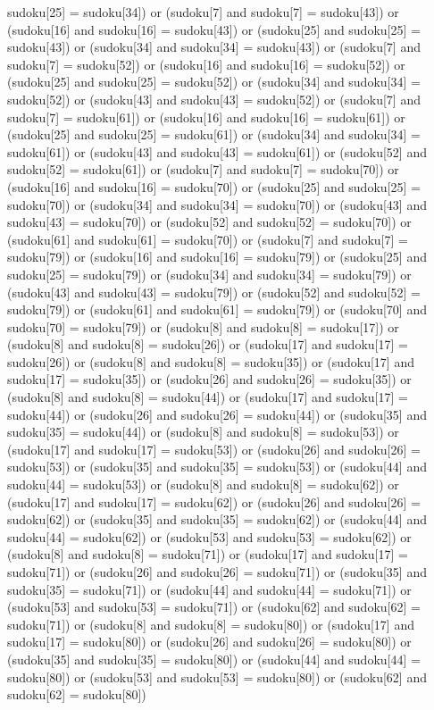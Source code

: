 \documentclass[8pt]{article}
\begin{document}
\begin{algorithm}[H]
sudoku[25] = sudoku[34]) or (sudoku[7]  and sudoku[7] = sudoku[43]) or (sudoku[16]  and sudoku[16] = sudoku[43]) or (sudoku[25]  and sudoku[25] = sudoku[43]) or (sudoku[34]  and sudoku[34] = sudoku[43]) or (sudoku[7]  and sudoku[7] = sudoku[52]) or (sudoku[16]  and sudoku[16] = sudoku[52]) or (sudoku[25]  and sudoku[25] = sudoku[52]) or (sudoku[34]  and sudoku[34] = sudoku[52]) or (sudoku[43]  and sudoku[43] = sudoku[52]) or (sudoku[7]  and sudoku[7] = sudoku[61]) or (sudoku[16]  and sudoku[16] = sudoku[61]) or (sudoku[25]  and sudoku[25] = sudoku[61]) or (sudoku[34]  and sudoku[34] = sudoku[61]) or (sudoku[43]  and sudoku[43] = sudoku[61]) or (sudoku[52]  and sudoku[52] = sudoku[61]) or (sudoku[7]  and sudoku[7] = sudoku[70]) or (sudoku[16]  and sudoku[16] = sudoku[70]) or (sudoku[25]  and sudoku[25] = sudoku[70]) or (sudoku[34]  and sudoku[34] = sudoku[70]) or (sudoku[43]  and sudoku[43] = sudoku[70]) or (sudoku[52]  and sudoku[52] = sudoku[70]) or (sudoku[61]  and sudoku[61] = sudoku[70]) or (sudoku[7]  and sudoku[7] = sudoku[79]) or (sudoku[16]  and sudoku[16] = sudoku[79]) or (sudoku[25]  and sudoku[25] = sudoku[79]) or (sudoku[34]  and sudoku[34] = sudoku[79]) or (sudoku[43]  and sudoku[43] = sudoku[79]) or (sudoku[52]  and sudoku[52] = sudoku[79]) or (sudoku[61]  and sudoku[61] = sudoku[79]) or (sudoku[70]  and sudoku[70] = sudoku[79]) or (sudoku[8]  and sudoku[8] = sudoku[17]) or (sudoku[8]  and sudoku[8] = sudoku[26]) or (sudoku[17]  and sudoku[17] = sudoku[26]) or (sudoku[8]  and sudoku[8] = sudoku[35]) or (sudoku[17]  and sudoku[17] = sudoku[35]) or (sudoku[26]  and sudoku[26] = sudoku[35]) or (sudoku[8]  and sudoku[8] = sudoku[44]) or (sudoku[17]  and sudoku[17] = sudoku[44]) or (sudoku[26]  and sudoku[26] = sudoku[44]) or (sudoku[35]  and sudoku[35] = sudoku[44]) or (sudoku[8]  and sudoku[8] = sudoku[53]) or (sudoku[17]  and sudoku[17] = sudoku[53]) or (sudoku[26]  and sudoku[26] = sudoku[53]) or (sudoku[35]  and sudoku[35] = sudoku[53]) or (sudoku[44]  and sudoku[44] = sudoku[53]) or (sudoku[8]  and sudoku[8] = sudoku[62]) or (sudoku[17]  and sudoku[17] = sudoku[62]) or (sudoku[26]  and sudoku[26] = sudoku[62]) or (sudoku[35]  and sudoku[35] = sudoku[62]) or (sudoku[44]  and sudoku[44] = sudoku[62]) or (sudoku[53]  and sudoku[53] = sudoku[62]) or (sudoku[8]  and sudoku[8] = sudoku[71]) or (sudoku[17]  and sudoku[17] = sudoku[71]) or (sudoku[26]  and sudoku[26] = sudoku[71]) or (sudoku[35]  and sudoku[35] = sudoku[71]) or (sudoku[44]  and sudoku[44] = sudoku[71]) or (sudoku[53]  and sudoku[53] = sudoku[71]) or (sudoku[62]  and sudoku[62] = sudoku[71]) or (sudoku[8]  and sudoku[8] = sudoku[80]) or (sudoku[17]  and sudoku[17] = sudoku[80]) or (sudoku[26]  and sudoku[26] = sudoku[80]) or (sudoku[35]  and sudoku[35] = sudoku[80]) or (sudoku[44]  and sudoku[44] = sudoku[80]) or (sudoku[53]  and sudoku[53] = sudoku[80]) or (sudoku[62]  and sudoku[62] = sudoku[80]) 
\end{algorithm}
\end{document}
